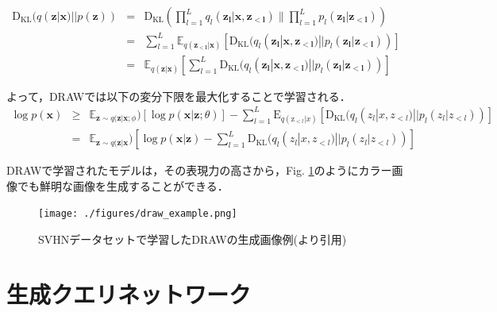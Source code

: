 \begin{eqnarray}
{ \mathrm { D_{KL} } } ( q ( \bm{z} | \bm{x} ) | | p ( \bm{z} ) )
&=& \mathrm{ D_{KL} }( \prod _ { l = 1 } ^ { L } q _ { l } (\bm{ z _ { l }} | \bm{x} , \bm{z _ { < l }} ) \| \prod _ { l = 1 } ^ { L } p _ { l } (\bm{ z _ { l }} | \bm{z _ { < l }} ) ) \nonumber \\
&=& \sum _ { l = 1 } ^ { L } \mathbb { E } _ { q ( \bm{ z  _ { < l }} | \bm{x} ) } [ \mathrm { D } _ { \mathrm { KL } } ( q _ { l } ( \bm{z _ { l }} | \bm{x} , \bm{z _ { < l }} ) | | p _ { l } ( \bm{z _ { l }} | \bm{z _ { < l }} ) ) ] \nonumber \\
&=& \mathbb { E } _ { q(\bm{ z } | \bm{x}) } [\sum _ { l = 1 } ^ { L } \mathrm { D } _ { \mathrm { KL } } ( q _ { l } ( \bm{z _ { l }} | \bm{x} , \bm{z _ { < l }} ) | | p _ { l } ( \bm{z _ { l }} | \bm{z _ { < l }} ) ) ]
\end{eqnarray}

よって，DRAWでは以下の変分下限を最大化することで学習される．
\begin{eqnarray}
\log p(\bm{x}) 
&\geq& \mathbb{E}_{\bm{z} \sim q(\bm{z}|\bm{x}; \phi}) [\log p(\bm{x}|\bm{z}; \theta)] - \sum _ { l = 1 } ^ { L } \mathrm { E } _ { q ( \mathrm { z } _ { < l } | x ) } [ \mathrm { D } _ { \mathrm { KL } } ( q _ { l } ( z _ { l } | x , z _ { < l } ) | | p _ { l } ( z _ { l } | z _ { < l } ) ) ] \nonumber \\
&=& \mathbb{E}_{\bm{z} \sim q(\bm{z}|\bm{x}}) [\log p(\bm{x}|\bm{z}) - \sum _ { l = 1 } ^ { L } \mathrm { D } _ { \mathrm { KL } } ( q _ { l } ( z _ { l } | x , z _ { < l } ) | | p _ { l } ( z _ { l } | z _ { < l } ) ) ] \label{eq:drawelbo}
\end{eqnarray}

DRAWで学習されたモデルは，その表現力の高さから，Fig. \ref{fig:draw_example}のようにカラー画像でも鮮明な画像を生成することができる．

\begin{figure}[tbp]
  \begin{center}
    \texttt{[image: ./figures/draw\_example.png]}
    \caption{SVHNデータセットで学習したDRAWの生成画像例(\cite{Gregor2015}より引用)}
    \label{fig:draw_example}
  \end{center}
\end{figure}

\section{生成クエリネットワーク}

